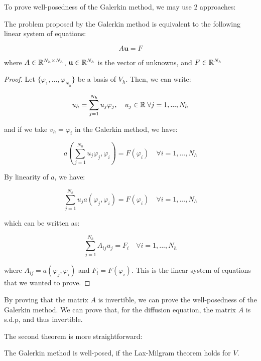 To prove well-posedness of the Galerkin method, we may use 2 approaches:

\begin{ftheorem}[Approach 1]
    The problem proposed by the Galerkin method is equivalent to the following linear system of equations:

    $$A \mathbf{u} = F$$

    where $A \in \mathbb{R}^{N_h \times N_h}$, $\mathbf{u} \in \mathbb{R}^{N_h}$ is the vector of unknowns, and $F \in \mathbb{R}^{N_h}$
\end{ftheorem}

\begin{proof}
    Let $\{ \varphi_1, \ldots, \varphi_{N_h} \}$ be a basis of $V_h$. Then, we can write:

    $$u_h = \sum_{j = 1}^{N_h} u_j \varphi_j, \quad u_j \in \mathbb{R} \; \forall j = 1, ..., N_h$$

    and if we take $v_h = \varphi_i$ in the Galerkin method, we have:

    $$a\left( \sum_{j = 1}^{N_h} u_j \varphi_j, \varphi_i \right) = F(\varphi_i) \quad \forall i = 1, ..., N_h$$

    By linearity of $a$, we have:

    $$\sum_{j = 1}^{N_h} u_j a(\varphi_j, \varphi_i) = F(\varphi_i) \quad \forall i = 1, ..., N_h$$

    which can be written as:

    $$\sum_{j = 1}^{N_h} A_{ij} u_j = F_i \quad \forall i = 1, ..., N_h$$

    where $A_{ij} = a(\varphi_j, \varphi_i)$ and $F_i = F(\varphi_i)$. This is the linear system of equations
    that we wanted to prove.
\end{proof}

\begin{fremark}
    By proving that the matrix $A$ is invertible, we can prove the well-posedness of the Galerkin method.
    We can prove that, for the diffusion equation, the matrix $A$ is s.d.p, and thus invertible.
\end{fremark}

\vspace{1em}

The second theorem is more straightforward:

\begin{ftheorem}[Approach 2]
    The Galerkin method is well-posed, if the Lax-Milgram theorem holds for $V$.
\end{ftheorem}

